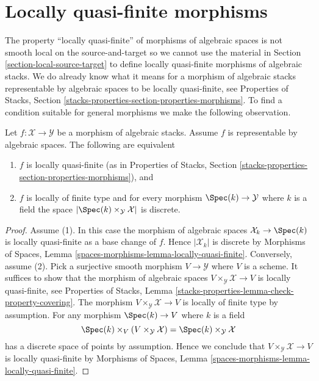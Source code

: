 \section{Locally quasi-finite morphisms}
\label{section-locally-quasi-finite}

\noindent
The property ``locally quasi-finite'' of morphisms of algebraic spaces
is not smooth local on the source-and-target so we cannot use the material in
Section \ref{section-local-source-target}
to define locally quasi-finite morphisms of algebraic stacks.
We do already know what it means for a morphism of algebraic stacks
representable by algebraic spaces to be locally quasi-finite, see
Properties of Stacks, Section
\ref{stacks-properties-section-properties-morphisms}.
To find a condition suitable for general morphisms we make the following
observation.

\begin{lemma}
\label{lemma-representable-by-spaces-quasi-finite}
Let $f : \mathcal{X} \to \mathcal{Y}$ be a morphism of algebraic stacks.
Assume $f$ is representable by algebraic spaces.
The following are equivalent
\begin{enumerate}
\item $f$ is locally quasi-finite (as in Properties of Stacks,
Section \ref{stacks-properties-section-properties-morphisms}), and
\item $f$ is locally of finite type and for every morphism
$\Spec(k) \to \mathcal{Y}$ where $k$ is a field the
space $|\Spec(k) \times_\mathcal{Y} \mathcal{X}|$ is discrete.
\end{enumerate}
\end{lemma}

\begin{proof}
Assume (1). In this case the morphism of algebraic spaces
$\mathcal{X}_k \to \Spec(k)$ is locally quasi-finite as a base change
of $f$. Hence $|\mathcal{X}_k|$ is discrete by
Morphisms of Spaces, Lemma \ref{spaces-morphisms-lemma-locally-quasi-finite}.
Conversely, assume (2). Pick a surjective smooth morphism
$V \to \mathcal{Y}$ where $V$ is a scheme. It suffices to show that the
morphism of algebraic spaces $V \times_\mathcal{Y} \mathcal{X} \to V$
is locally quasi-finite, see
Properties of Stacks, Lemma
\ref{stacks-properties-lemma-check-property-covering}.
The morphism $V \times_\mathcal{Y} \mathcal{X} \to V$ is locally of finite
type by assumption. For any morphism $\Spec(k) \to V$ where $k$ is a
field
$$
\Spec(k) \times_V (V \times_\mathcal{Y} \mathcal{X}) =
\Spec(k) \times_\mathcal{Y} \mathcal{X}
$$
has a discrete space of points by assumption. Hence we conclude that
$V \times_\mathcal{Y} \mathcal{X} \to V$ is locally quasi-finite by
Morphisms of Spaces, Lemma \ref{spaces-morphisms-lemma-locally-quasi-finite}.
\end{proof}

